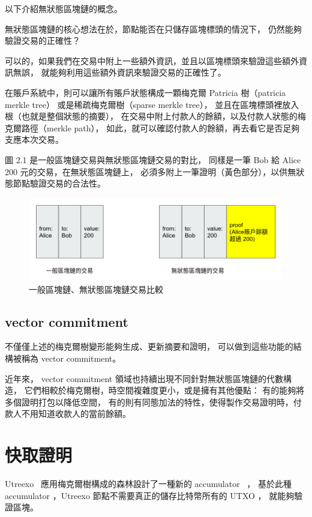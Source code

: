 以下介紹無狀態區塊鏈的概念。

無狀態區塊鏈的核心想法在於，節點能否在只儲存區塊標頭的情況下，
仍然能夠驗證交易的正確性？

可以的，如果我們在交易中附上一些額外資訊，並且以區塊標頭來驗證這些額外資訊無誤，
就能夠利用這些額外資訊來驗證交易的正確性了。

在賬戶系統中，則可以讓所有賬戶狀態構成一顆梅克爾 Patricia 樹（patricia merkle tree）
或是稀疏梅克爾樹（sparse merkle tree）\cite{dahlberg2016efficient}，
並且在區塊標頭裡放入根（也就是整個狀態的摘要），
在交易中附上付款人的餘額，以及付款人狀態的梅克爾路徑（merkle path），
如此，就可以確認付款人的餘額，再去看它是否足夠支應本次交易。

圖 2.1 是一般區塊鏈交易與無狀態區塊鏈交易的對比，
同樣是一筆 Bob 給 Alice 200 元的交易，在無狀態區塊鏈上，
必須多附上一筆證明（黃色部分），以供無狀態節點驗證交易的合法性。

\begin{figure}
\includegraphics[width=\textwidth]{stateless-tx}
\caption{一般區塊鏈、無狀態區塊鏈交易比較}
\end{figure}

\subsection{vector commitment}

不僅僅上述的梅克爾樹變形能夠生成、更新摘要和證明，
可以做到這些功能的結構被稱為 vector commitment\cite{catalano2013vector}。

近年來， vector commitment 領域也持續出現不同針對無狀態區塊鏈的代數構造，
它們相較於梅克爾樹，時空間複雜度更小，或是擁有其他優點：
有的能夠將多個證明打包以降低空間\cite{boneh2019batching}，
有的則有同態加法的特性，使得製作交易證明時，付款人不用知道收款人的當前餘額\cite{chepurnoy2018edrax}。

\section{快取證明}

Utreexo~\cite{dryja2019utreexo} 應用梅克爾樹構成的森林設計了一種新的 accumulator ~\cite{benaloh1993one}，
基於此種 accumulator ，Utreexo 節點不需要真正的儲存比特幣所有的 UTXO ，
就能夠驗證區塊。


